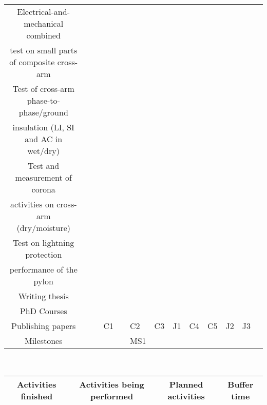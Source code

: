 \begin{tabular}{|c|p{\tabcolwidth}|p{\tabcolwidth}|p{\tabcolwidth}|p{\tabcolwidth}|p{\tabcolwidth}|p{\tabcolwidth}|p{\tabcolwidth}|p{\tabcolwidth}|p{\tabcolwidth}|p{\tabcolwidth}|p{\tabcolwidth}|p{\tabcolwidth}|}
    \hline
    Electrical-and-mechanical combined & & & & & & \cellcolor{red} & \cellcolor{red} & & & & & \cellcolor{lighterblue}\\
    test on small parts of composite cross-arm & & & & & & \cellcolor{red} & \cellcolor{red} & & & & &  \cellcolor{lighterblue}\\
    \hline
    Test of cross-arm phase-to-phase/ground & & & & & & & \cellcolor{red} & \cellcolor{red} & & & &  \cellcolor{lighterblue}\\
    insulation (LI, SI and AC in wet/dry) & & & & & & & \cellcolor{red} & \cellcolor{red} & & & &  \cellcolor{lighterblue}\\
    \hline 
    Test and measurement of corona & & & & & & & & & \cellcolor{red} & \cellcolor{red} & &  \cellcolor{lighterblue}\\
    activities on cross-arm (dry/moisture) & & & & & & & & & \cellcolor{red} & \cellcolor{red} & &  \cellcolor{lighterblue}\\
    \hline 
    Test on lightning protection & & & & & & & & & \cellcolor{red} & \cellcolor{red} & &  \cellcolor{lighterblue}\\
    performance of the pylon & & & & & & & & & \cellcolor{red} & \cellcolor{red} & &  \cellcolor{lighterblue}\\
    \hline 
    Writing thesis & & & & \cellcolor{red}&\cellcolor{red} & & &\cellcolor{red} &\cellcolor{red} &\cellcolor{red} & \cellcolor{red} &\cellcolor{lighterblue}
    \\
    \hline PhD Courses & & \cellcolor{green} & & & \cellcolor{red} & & \cellcolor{red} & \cellcolor{red} & & \cellcolor{red} & & \cellcolor{lighterblue}
    \\
    \hline 
    Publishing papers & & & \centering C1 & & \centering C2 & \centering C3 &\centering J1&\centering C4 & \centering C5 & \centering J2 & \centering J3 &  \cellcolor{lighterblue}
    \\
    \hline
    Milestones& & & & & {\scriptsize MS1} & \centering {\scriptsize MS2} &  \centering {\scriptsize MS3} & \centering {\scriptsize MS4} & & \centering {\scriptsize MS5} & \centering {\scriptsize MS6} & \cellcolor{lighterblue}
    \\
    \hline
\end{tabular}
\vspace{0.3cm}
\\
\begin{tabular}[h]{|c|c|c|c|}
\hline
\cellcolor{green} Activities finished & \cellcolor{yellow} Activities being performed & \cellcolor{red} Planned activities & \cellcolor{lighterblue} Buffer time\\
\hline
\end{tabular}
